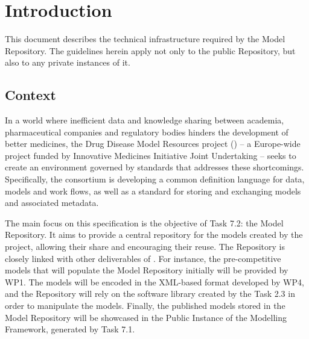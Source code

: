 \section{Introduction}
\label{introduction}
This document describes the technical infrastructure required by the \ddmore Model Repository. The guidelines herein apply not only to the public Repository, but also to any private instances of it.

\subsection{Context}
\label{context}
In a world where inefficient data and knowledge sharing between academia, pharmaceutical companies and regulatory bodies hinders the development of better medicines, the Drug Disease Model Resources project (\ddmore) -- a Europe-wide project funded by Innovative Medicines Initiative Joint Undertaking -- seeks to create an environment governed by standards that addresses these shortcomings. Specifically, the \ddmore consortium is developing a common definition language for data, models and work flows, as well as a standard for storing and exchanging \glspl{model} and associated metadata\cite{ddmore:dow}.

The main focus on this specification is the objective of Task 7.2: the \ddmore Model Repository. It aims to provide a central repository for the models created by the project, allowing their share and encouraging their reuse. The Repository is closely linked with other deliverables of \ddmore. For instance, the pre-competitive models that will populate the Model Repository initially will be provided by WP1. The models will be encoded in the XML-based format developed by WP4, and the Repository will rely on the software library created by the Task 2.3 in order to manipulate the models. Finally, the published models stored in the \ddmore Model Repository will be showcased in the Public Instance of the Modelling Framework, generated by Task 7.1.


